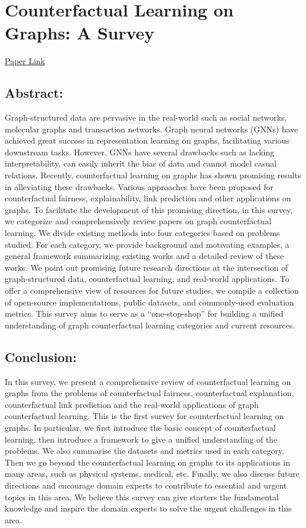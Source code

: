 \documentclass[]{report}
\begin{document}
	
	\chapter*{Counterfactual Learning on Graphs: A Survey}
	\begin{center}
		\href{https://arxiv.org/abs/2304.01391}{Paper Link}
	\end{center}
	\section*{Abstract:}
	Graph-structured data are pervasive in the real-world such as social networks, molecular graphs and transaction networks. Graph neural networks (GNNs) have achieved great success in representation learning on graphs, facilitating various downstream tasks. However, GNNs have several drawbacks such as lacking interpretability, can easily inherit the bias of data and cannot model casual relations. Recently, counterfactual learning on graphs has shown promising results in alleviating these drawbacks. Various approaches have been proposed for counterfactual fairness, explainability, link prediction and other applications on graphs. To facilitate the development of this promising direction, in this survey, we categorize and comprehensively review papers on graph counterfactual learning. We divide existing methods into four categories based on problems studied. For each category, we provide background and motivating examples, a general framework summarizing existing works and a detailed review of these works. We point out promising future research directions at the intersection of graph-structured data, counterfactual learning, and real-world applications. To offer a comprehensive view of resources for future studies, we compile a collection of open-source implementations, public datasets, and commonly-used evaluation metrics. This survey aims to serve as a “one-stop-shop” for building a unified understanding of graph counterfactual learning categories and current resources.
	
	\section*{Conclusion:}
	In this survey, we present a comprehensive review of counterfactual learning on graphs from the problems of counterfactual fairness, counterfactual explanation, counterfactual link prediction and the real-world applications of graph counterfactual learning. This is the first survey for counterfactual learning on graphs. In particular, we first introduce the basic concept of counterfactual learning, then introduce a framework to give a unified understanding of the problems. We also summarise the datasets and metrics used in each category. Then we go beyond the counterfactual learning on graphs to its applications in many areas, such as physical systems, medical, etc. Finally, we also discuss future directions and encourage domain experts to contribute to essential and urgent topics in this area. We believe this survey can give starters the fundamental knowledge and inspire the domain experts to solve the urgent challenges in this area.
	
\end{document}
